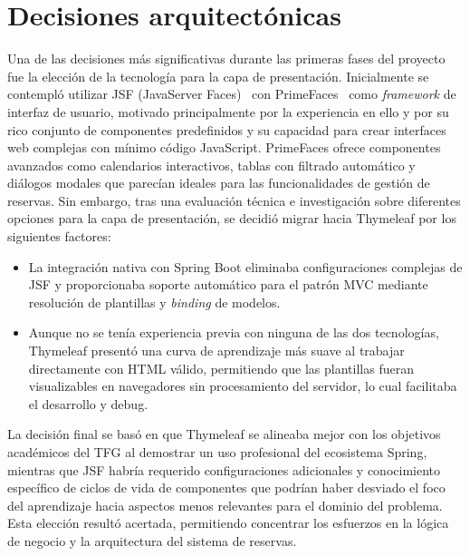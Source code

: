 \section{Decisiones arquitectónicas}\label{decisiones-arquitectonicas}
Una de las decisiones más significativas durante las primeras fases del proyecto fue la elección de la tecnología para la capa de presentación. Inicialmente se contempló utilizar JSF (JavaServer Faces)~\cite{jsf} con PrimeFaces~\cite{primefaces} como \emph{framework} de interfaz de usuario, motivado principalmente por la experiencia en ello y por su rico conjunto de componentes predefinidos y su capacidad para crear interfaces web complejas con mínimo código JavaScript. PrimeFaces ofrece componentes avanzados como calendarios interactivos, tablas con filtrado automático y diálogos modales que parecían ideales para las funcionalidades de gestión de reservas.
Sin embargo, tras una evaluación técnica e investigación sobre diferentes opciones para la capa de presentación, se decidió migrar hacia Thymeleaf por los siguientes factores:

\begin{itemize}
\tightlist
\item
La integración nativa con Spring Boot eliminaba configuraciones complejas de JSF y proporcionaba soporte automático para el patrón MVC mediante resolución de plantillas y \emph{binding} de modelos.
\item
Aunque no se tenía experiencia previa con ninguna de las dos tecnologías, Thymeleaf presentó una curva de aprendizaje más suave al trabajar directamente con HTML válido, permitiendo que las plantillas fueran visualizables en navegadores sin procesamiento del servidor, lo cual facilitaba el desarrollo y debug.
\end{itemize}

La decisión final se basó en que Thymeleaf se alineaba mejor con los objetivos académicos del TFG al demostrar un uso profesional del ecosistema Spring, mientras que JSF habría requerido configuraciones adicionales y conocimiento específico de ciclos de vida de componentes que podrían haber desviado el foco del aprendizaje hacia aspectos menos relevantes para el dominio del problema. Esta elección resultó acertada, permitiendo concentrar los esfuerzos en la lógica de negocio y la arquitectura del sistema de reservas.\\

